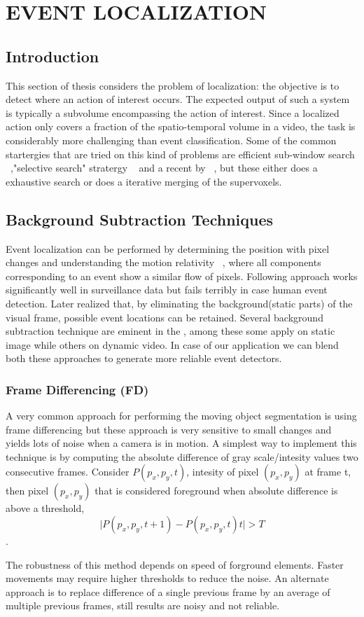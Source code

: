 \chapter{EVENT LOCALIZATION}
 \label{chap:eventLo}
\section{Introduction}
This section of thesis considers the problem of localization: the objective is to detect where an action of interest occurs. The expected output of such a system is typically a subvolume encompassing the action of interest. Since a localized action only covers a fraction of the spatio-temporal volume in a video, the task is considerably more challenging than event classification. Some of the common startergies that are tried on this kind of problems are efficient sub-window search ~\citep{subwindowsearch},"selective search" stratergy ~\citep{selectivesearch}  and a recent by ~\cite{tubelet}, but these either does a exhaustive search or does a iterative merging of the supervoxels. 

\section{Background Subtraction Techniques} 
\par Event localization can be performed by determining the position with pixel changes and understanding the motion relativity ~\citep{Basharat08}, where all components corresponding to an event show a similar flow of pixels. Following approach works significantly well in surveillance data but fails terribly in case human event detection. Later realized that, by eliminating the background(static parts) of the visual frame,  possible event locations can be retained.  Several background subtraction technique are eminent in the \cite{Piccardi04}, among these some apply on static image while others on dynamic video. In case of our application we can blend both these approaches to generate more reliable event detectors.

\subsection{Frame Differencing (FD)}
A very common approach for performing the moving object segmentation is using frame differencing but these approach is very sensitive to small changes and yields lots of noise when a camera is in motion. A simplest way to implement this technique is by computing the absolute difference of gray scale/intesity values two consecutive frames. Consider $P(p_x,p_y,t)$, intesity of pixel $(p_x,p_y)$ at frame t, then pixel $(p_x,p_y)$ that is considered foreground when absolute difference is above a threshold,$$\vert P(p_x,p_y,t+1) - P(p_x,p_y,t)t\vert > T$$.
\par The robustness of this method depends on speed of forground elements. Faster movements may require higher thresholds to reduce the noise.  An alternate approach is to replace difference of a single previous frame  by an average of multiple previous frames, still results are noisy and not reliable.

